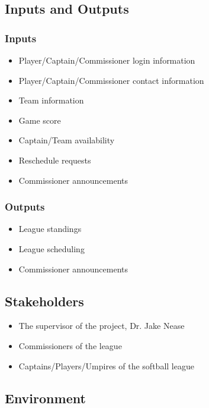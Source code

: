 \documentclass{article}
\begin{document}
\subsection{Inputs and Outputs}

\subsubsection{Inputs}

\begin{itemize}
    \item Player/Captain/Commissioner login information
    \item Player/Captain/Commissioner contact information
    \item Team information
    \item Game score
    \item Captain/Team availability
    \item Reschedule requests
    \item Commissioner announcements
\end{itemize}

\subsubsection{Outputs}

\begin{itemize}
    \item League standings
    \item League scheduling
    \item Commissioner announcements
\end{itemize}

\subsection{Stakeholders}

\begin{itemize}
    \item The supervisor of the project, Dr. Jake Nease
    \item Commissioners of the league
    \item Captains/Players/Umpires of the softball league
\end{itemize}

\subsection{Environment}
\end{document}
